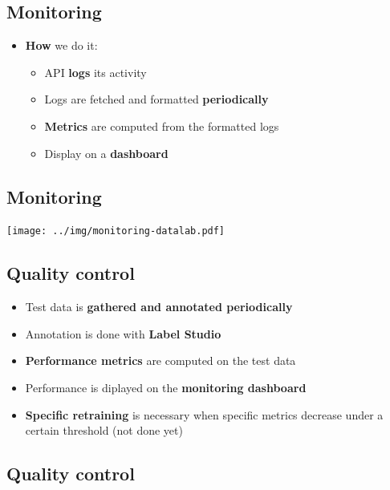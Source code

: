 \documentclass[
  letterpaper,
  DIV=11,
  numbers=noendperiod]{scrartcl}
\providecommand{\tightlist}{%
  \setlength{\itemsep}{0pt}\setlength{\parskip}{0pt}}\usepackage{longtable,booktabs,array}
\begin{document}
\subsection{Monitoring}\label{monitoring-1}

\begin{itemize}
\tightlist
\item
  {\textbf{How}} we do it:

  \begin{itemize}
  \tightlist
  \item
    API {\textbf{logs}} its activity
  \item
    Logs are fetched and formatted {\textbf{periodically}}
  \item
    {\textbf{Metrics}} are computed from the formatted logs
  \item
    Display on a {\textbf{dashboard}}
  \end{itemize}
\end{itemize}

\subsection{Monitoring}\label{monitoring-2}

\begin{center}
\texttt{[image: ../img/monitoring-datalab.pdf]}
\end{center}

\subsection{Quality control}\label{quality-control}

\begin{itemize}
\tightlist
\item
  Test data is {\textbf{gathered and annotated periodically}}
\item
  Annotation is done with {\textbf{Label Studio}}
\item
  {\textbf{Performance metrics}} are computed on the test data
\item
  Performance is diplayed on the {\textbf{monitoring dashboard}}
\item
  {\textbf{Specific retraining}} is necessary when specific metrics
  decrease under a certain threshold (not done yet)
\end{itemize}

\subsection{Quality control}\label{quality-control-1}
\end{document}
